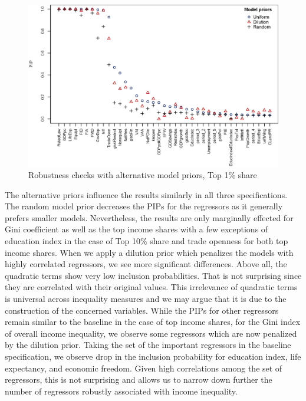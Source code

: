 \documentclass[preprint, nonatbib, 10pt]{elsarticle}
\begin{document}
\begin{figure}[ht!]
  \caption{Robustness checks with alternative model priors, Top 1\% share}
  \label{fig:top1_comp}
  \centering
  \includegraphics[width=\textwidth, keepaspectratio]{figures/model_priors_comparison_top1}
\end{figure}

The alternative priors influence the results similarly in all three specifications. The random model prior decreases the \acp{PIP} for the regressors as it generally prefers smaller models. Nevertheless, the results are only marginally effected for Gini coefficient as well as the top income shares with a few exceptions of education index in the case of Top 10\% share and trade openness for both top income shares. When we apply a dilution prior which penalizes the models with highly correlated regressors, we see more significant differences. Above all, the quadratic terms show very low inclusion probabilities. That is not surprising since they are correlated with their original values. This irrelevance of quadratic terms is universal across inequality measures and we may argue that it is due to the construction of the concerned variables. While the \acp{PIP} for other regressors remain similar to the baseline in the case of top income shares, for the Gini index of overall income inequality, we observe some regressors which are now penalized by the dilution prior. Taking the set of the important regressors in the baseline specification, we observe drop in the inclusion probability for education index, life expectancy, and economic freedom. Given high correlations among the set of regressors, this is not surprising and allows us to narrow down further the number of regressors robustly associated with income inequality.
\end{document}
